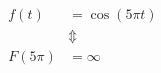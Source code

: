 \documentclass[preview]{standalone}
\begin{document}
\begin{align*}
f(t)&=\cos{(5\pi t)} \\ &\Updownarrow \\ F(5\pi)&=\infty
\end{align*}
\end{document}
